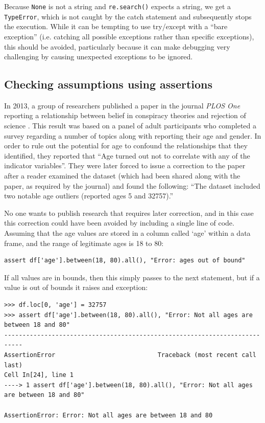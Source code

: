 Because \texttt{None} is not a string and \texttt{re.search()} expects a string, we get a \texttt{TypeError}, which is not caught by the catch statement and subsequently stops the execution.  While it can be tempting to use try/except with a ``bare exception'' (i.e. catching all possible exceptions rather than specific exceptions), this should be avoided, particularly because it can make debugging very challenging by causing unexpected exceptions to be ignored.

\subsection{Checking assumptions using assertions}

In 2013, a group of researchers published a paper in the journal \textit{PLOS One} reporting a relationship between belief in conspiracy theories and rejection of science \citep{Lewandowsky:2013aa}.
This result was based on a panel of adult participants who completed a survey regarding a number of topics along with reporting their age and gender.
In order to rule out the potential for age to confound the relationships that they identified, they reported that ``Age turned out not to correlate with any of the indicator variables''.
They were later forced to issue a correction to the paper after a reader examined the dataset (which had been shared along with the paper, as required by the journal) and found the following: ``The dataset included two notable age outliers (reported ages 5 and 32757).''

No one wants to publish research that requires later correction, and in this case this correction could have been avoided by including a single line of code.
Assuming that the age values are stored in a column called `age' within a data frame, and the range of legitimate ages is 18 to 80:

\begin{lstlisting}[style=Pythonshort]
assert df['age'].between(18, 80).all(), "Error: ages out of bound"
\end{lstlisting}

If all values are in bounds, then this simply passes to the next statement, but if a value is out of bounds it raises and exception:

\begin{lstlisting}[style=repl]
>>> df.loc[0, 'age'] = 32757
>>> assert df['age'].between(18, 80).all(), "Error: Not all ages are between 18 and 80"
---------------------------------------------------------------------------
AssertionError                            Traceback (most recent call last)
Cell In[24], line 1
----> 1 assert df['age'].between(18, 80).all(), "Error: Not all ages are between 18 and 80"

AssertionError: Error: Not all ages are between 18 and 80
\end{lstlisting}


